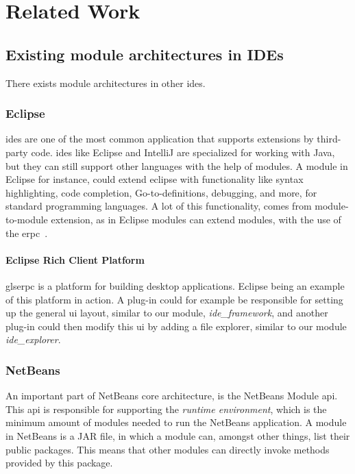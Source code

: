 \chapter{Related Work} \label{cha:related}

\section{Existing module architectures in IDEs}

There exists module architectures in other \gls*{ide}s.


\subsection{Eclipse}

\gls*{ide}s are one of the most common application that supports extensions by
third-party code. \gls*{ide}s like Eclipse and IntelliJ are specialized for
working with Java, but they can still support other languages with the help of
modules. A module in Eclipse for instance, could extend \gls*{eclipse} with
functionality like syntax highlighting, code completion, Go-to-definitions,
debugging, and more, for standard programming languages. A lot of this
functionality, comes from module-to-module extension, as in Eclipse modules can
extend modules, with the use of the \gls*{erpc}~\cite{eclipseRcp}.

\subsubsection{Eclipse Rich Client Platform}
\*gls{erpc} is a platform for building desktop applications. Eclipse being an
example of this platform in action. A plug-in could for example be responsible
for setting up the general \gls*{ui} layout, similar to our module,
\textit{ide\_framework}, and another plug-in could then modify this \gls*{ui} by
adding a file explorer, similar to our module \textit{ide\_explorer}.


\subsection{NetBeans}

An important part of NetBeans core architecture, is the NetBeans Module
\gls*{api}. This \gls{api} is responsible for supporting the
\textit{runtime environment}, which is the minimum amount of modules needed to
run the NetBeans application. A module in NetBeans is a JAR file, in which a
module can, amongst other things, list their public packages. This means that
other modules can directly invoke methods provided by this package.


